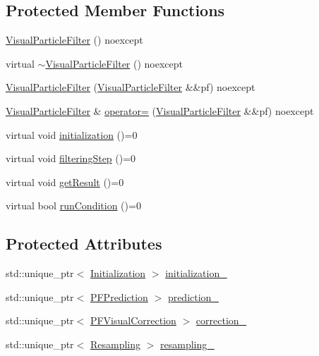 \subsection*{Protected Member Functions}
\begin{DoxyCompactItemize}
\item 
\mbox{\hyperlink{classbfl_1_1VisualParticleFilter_adaebe32968f0b6f5bccf40894433baf4}{Visual\+Particle\+Filter}} () noexcept
\item 
virtual \mbox{\hyperlink{classbfl_1_1VisualParticleFilter_abee57310e0ac87faacb3e8684a6f7884}{$\sim$\+Visual\+Particle\+Filter}} () noexcept
\item 
\mbox{\hyperlink{classbfl_1_1VisualParticleFilter_ae26350633cde8798ed98f62728c98c5c}{Visual\+Particle\+Filter}} (\mbox{\hyperlink{classbfl_1_1VisualParticleFilter}{Visual\+Particle\+Filter}} \&\&pf) noexcept
\item 
\mbox{\hyperlink{classbfl_1_1VisualParticleFilter}{Visual\+Particle\+Filter}} \& \mbox{\hyperlink{classbfl_1_1VisualParticleFilter_a3044d7450e02d074207c61347b2c948f}{operator=}} (\mbox{\hyperlink{classbfl_1_1VisualParticleFilter}{Visual\+Particle\+Filter}} \&\&pf) noexcept
\item 
virtual void \mbox{\hyperlink{classbfl_1_1FilteringAlgorithm_af2a072aa51407fe5544bdbb7ce466e2a}{initialization}} ()=0
\item 
virtual void \mbox{\hyperlink{classbfl_1_1FilteringAlgorithm_ab3bceb43b5810a4bf1da884b8a0b145a}{filtering\+Step}} ()=0
\item 
virtual void \mbox{\hyperlink{classbfl_1_1FilteringAlgorithm_acdfebf68405a427491e4dd9d020ae09b}{get\+Result}} ()=0
\item 
virtual bool \mbox{\hyperlink{classbfl_1_1FilteringAlgorithm_a5fc12882356f6906b102fbfff2bc4b7c}{run\+Condition}} ()=0
\end{DoxyCompactItemize}
\subsection*{Protected Attributes}
\begin{DoxyCompactItemize}
\item 
std\+::unique\+\_\+ptr$<$ \mbox{\hyperlink{classbfl_1_1Initialization}{Initialization}} $>$ \mbox{\hyperlink{classbfl_1_1VisualParticleFilter_abe1c7110a109cd18adc923e23179f531}{initialization\+\_\+}}
\item 
std\+::unique\+\_\+ptr$<$ \mbox{\hyperlink{classbfl_1_1PFPrediction}{P\+F\+Prediction}} $>$ \mbox{\hyperlink{classbfl_1_1VisualParticleFilter_a3c2ffe1f100e4fb4979922fa76b41494}{prediction\+\_\+}}
\item 
std\+::unique\+\_\+ptr$<$ \mbox{\hyperlink{classbfl_1_1PFVisualCorrection}{P\+F\+Visual\+Correction}} $>$ \mbox{\hyperlink{classbfl_1_1VisualParticleFilter_af267eeba1c05e0961545ec9c4efc0bbf}{correction\+\_\+}}
\item 
std\+::unique\+\_\+ptr$<$ \mbox{\hyperlink{classbfl_1_1Resampling}{Resampling}} $>$ \mbox{\hyperlink{classbfl_1_1VisualParticleFilter_aa0b7a55de5ccd0ffb6ebdf765bf73e07}{resampling\+\_\+}}
\end{DoxyCompactItemize}


